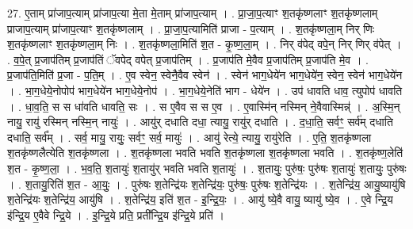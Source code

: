 \documentclass[17pt]{extarticle}
\begin{document}
27. ए॒ताम् प्रा॑जाप॒त्याम् प्रा॑जाप॒त्या मे॒ता मे॒ताम् प्रा॑जाप॒त्याम् । . प्रा॒जा॒प॒त्याꣳ श॒तकृ॑ष्णलाꣳ श॒तकृ॑ष्णलाम् प्राजाप॒त्याम् प्रा॑जाप॒त्याꣳ श॒तकृ॑ष्णलाम् । . प्रा॒जा॒प॒त्यामिति॑ प्राजा - प॒त्याम् । . श॒तकृ॑ष्णला॒म् निर् णिः श॒तकृ॑ष्णलाꣳ श॒तकृ॑ष्णला॒म् निः । . श॒तकृ॑ष्णला॒मिति॑ श॒त - कृ॒ष्ण॒ला॒म् । . निर् व॑पेद् वपे॒न् निर् णिर् व॑पेत् । . व॒पे॒त् प्र॒जाप॑तिम् प्र॒जाप॑तिं ॅवपेद् वपेत् प्र॒जाप॑तिम् । . प्र॒जाप॑ति मे॒वैव प्र॒जाप॑तिम् प्र॒जाप॑ति मे॒व । . प्र॒जाप॑ति॒मिति॑ प्र॒जा - प॒ति॒म् । . ए॒व स्वेन॒ स्वेनै॒वैव स्वेन॑ । . स्वेन॑ भाग॒धेये॑न भाग॒धेये॑न॒ स्वेन॒ स्वेन॑ भाग॒धेये॑न । . भा॒ग॒धेये॒नोपोप॑ भाग॒धेये॑न भाग॒धेये॒नोप॑ । . भा॒ग॒धेये॒नेति॑ भाग - धेये॑न । . उप॑ धावति धाव॒ त्युपोप॑ धावति । . धा॒व॒ति॒ स स धा॑वति धावति॒ सः । . स ए॒वैव स स ए॒व । . ए॒वास्मि॑न् नस्मिन् ने॒वैवास्मिन्न्॑ । . अ॒स्मि॒न् नायु॒ रायु॑ रस्मिन् नस्मि॒न् नायुः॑ । . आयु॑र् दधाति दधा॒ त्यायु॒ रायु॑र् दधाति । . द॒धा॒ति॒ सर्वꣳ॒॒ सर्व॑म् दधाति दधाति॒ सर्व᳚म् । . सर्व॒ मायु॒ रायुः॒ सर्वꣳ॒॒ सर्व॒ मायुः॑ । . आयु॑ रेत्ये॒ त्यायु॒ रायु॑रेति । . ए॒ति॒ श॒तकृ॑ष्णला श॒तकृ॑ष्णलैत्येति श॒तकृ॑ष्णला । . श॒तकृ॑ष्णला भवति भवति श॒तकृ॑ष्णला श॒तकृ॑ष्णला भवति । . श॒तकृ॑ष्ण॒लेति॑ श॒त - कृ॒ष्ण॒ला॒ । . भ॒व॒ति॒ श॒तायुः॑ श॒तायु॑र् भवति भवति श॒तायुः॑ । . श॒तायुः॒ पुरु॑षः॒ पुरु॑षः श॒तायुः॑ श॒तायुः॒ पुरु॑षः । . श॒तायु॒रिति॑ श॒त - आ॒युः॒ । . पुरु॑षः श॒तेन्द्रि॑यः श॒तेन्द्रि॑यः॒ पुरु॑षः॒ पुरु॑षः श॒तेन्द्रि॑यः । . श॒तेन्द्रि॑य॒ आयु॒ष्यायु॑षि श॒तेन्द्रि॑यः श॒तेन्द्रि॑य॒ आयु॑षि । . श॒तेन्द्रि॑य॒ इति॑ श॒त - इ॒न्द्रि॒यः॒ । . आयु॑ ष्ये॒वै वायु॒ ष्यायु॑ ष्ये॒व । . ए॒वे न्द्रि॒य इ॑न्द्रि॒य ए॒वैवे न्द्रि॒ये । . इ॒न्द्रि॒ये प्रति॒ प्रती᳚न्द्रि॒य इ॑न्द्रि॒ये प्रति॑ । \newline
\end{document}
